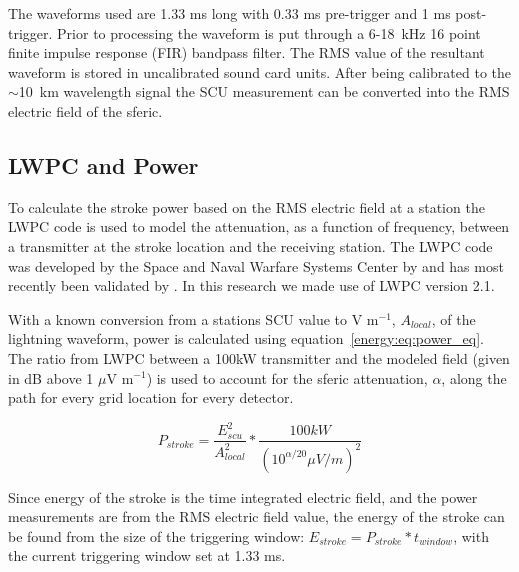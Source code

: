 The waveforms used are 1.33 ms long with 0.33 ms pre-trigger and 1 ms post-trigger.
Prior to processing the waveform is put through a 6-18~kHz 16 point finite impulse response (FIR) bandpass filter.
The RMS value of the resultant waveform is stored in uncalibrated sound card units.
After being calibrated to the $\sim$10~km wavelength signal the SCU measurement can be converted into the RMS electric field of the sferic. 

\subsection{LWPC and Power}

To calculate the stroke power based on the RMS electric field at a station the LWPC code is used to model the attenuation, as a function of frequency, between a transmitter at the stroke location and the receiving station.
The LWPC code was developed by the Space and Naval Warfare Systems Center by \citet{Ferguson1998} and has most recently been validated by \citet{Thomson2011}.
In this research we made use of LWPC version 2.1.

With a known conversion from a stations SCU value to V m$^{-1}$, $A_{local}$, of the lightning waveform, power is calculated using equation~\ref{energy:eq:power_eq}.
The ratio from LWPC between a 100kW transmitter and the modeled field (given in dB above 1 $\mu$V m$^{-1}$) is used to account for the sferic attenuation, $\alpha$, along the path for every grid location for every detector.

\begin{equation}
P_{stroke}=\frac{E_{scu}^2}{A_{local}^2} * \frac{100kW}{(10^{\alpha/20}\mu V/m)^2}
\label{energy:eq:power_eq}
\end{equation}

Since energy of the stroke is the time integrated electric field, and the power measurements are from the RMS electric field value, the energy of the stroke can be found from the size of the triggering window: $E_{stroke}=P_{stroke} * t_{window}$, with the current triggering window set at 1.33 ms.

